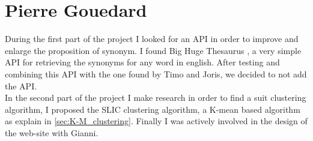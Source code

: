 \section{Pierre Gouedard}

During the first part of the project I looked for an API in order to improve and enlarge the proposition of synonym. I found Big Huge Thesaurus \cite{BGT}, a very simple API for retrieving the synonyms for any word in english. After testing and combining this API with the one found by Timo and Joris, we decided to not add the API.\\
In the second part of the project I make research in order to find a suit clustering algorithm, I proposed the SLIC clustering algorithm,  a K-mean based algorithm as explain in \ref{sec:K-M_clustering}. Finally I was actively involved in the design of the web-site with Gianni.  


